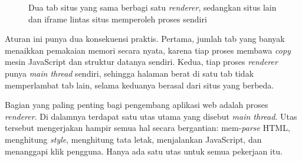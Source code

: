 \begin{figure}[!htb]
  \centering
  \caption{Dua tab situs yang sama berbagi satu \textit{renderer}, sedangkan
           situs lain dan iframe lintas situs memperoleh proses sendiri}
  \label{fig:tab-proses}
\end{figure}

Aturan ini punya dua konsekuensi praktis. Pertama, jumlah tab yang banyak
menaikkan pemakaian memori secara nyata, karena tiap proses membawa \textit{copy}
mesin JavaScript dan struktur datanya sendiri. Kedua, tiap proses
\textit{renderer} punya \textit{main thread} sendiri, sehingga halaman berat di
satu tab tidak memperlambat tab lain, selama keduanya berasal dari situs yang
berbeda.

Bagian yang paling penting bagi pengembang aplikasi web adalah proses
\textit{renderer}. Di dalamnya terdapat satu utas utama yang disebut
\textit{main thread}. Utas tersebut mengerjakan hampir semua hal secara
bergantian: mem-\textit{parse} HTML, menghitung \textit{style}, menghitung tata
letak, menjalankan JavaScript, dan menanggapi klik pengguna. Hanya ada satu
utas untuk semua pekerjaan itu.


